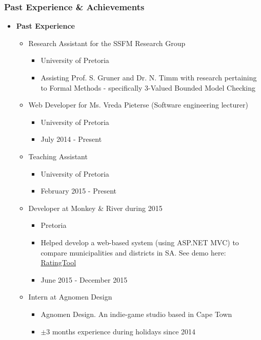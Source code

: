 \documentclass{article}
\begin{document}
\subsubsection{Past Experience \& Achievements}
\begin{itemize}
	\item \textbf{Past Experience}
	\begin{itemize}
		\item Research Assistant for the SSFM Research Group
		\begin{itemize}
			\item University of Pretoria
			\item Assisting Prof. S. Gruner and Dr. N. Timm with research pertaining to Formal Methods - specifically 3-Valued Bounded Model Checking
		\end{itemize}
		\item Web Developer for Ms. Vreda Pieterse (Software engineering lecturer)
		\begin{itemize}
			\item University of Pretoria
			\item July 2014 - Present
		\end{itemize}
		\item Teaching Assistant
		\begin{itemize}
			\item University of Pretoria
			\item February 2015 - Present
		\end{itemize}
		
		\item Developer at Monkey \& River during 2015
		\begin{itemize}
			\item Pretoria
			\item Helped develop a web-based system (using ASP.NET MVC) to compare municipalities and districts in SA. See demo here: \href{http://salgabarometerdemo.org.za/RatingTool}{RatingTool}
			\item June 2015 - December 2015
		\end{itemize}
		
		\item Intern at Agnomen Design
		\begin{itemize}
			\item Agnomen Design. An indie-game studio based in Cape Town
			\item $ \pm 3 $ months experience during holidays since 2014
		\end{itemize}
	\end{itemize}
	

\end{itemize}
\end{document}
